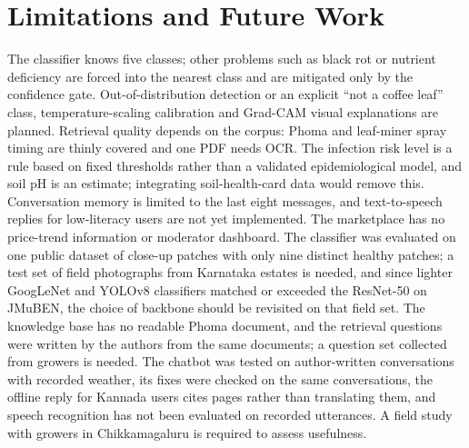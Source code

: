 \section{Limitations and Future Work}
The classifier knows five classes; other problems such as black rot or nutrient deficiency are forced into the nearest
class and are mitigated only by the confidence gate. Out-of-distribution detection or an explicit ``not a coffee leaf''
class, temperature-scaling calibration and Grad-CAM visual explanations are planned. Retrieval quality depends on the
corpus: Phoma and leaf-miner spray timing are thinly covered and one PDF needs OCR. The infection risk level is a rule
based on fixed thresholds rather than a validated epidemiological model, and soil pH is an estimate; integrating
soil-health-card data would remove this. Conversation memory is limited to the last eight messages, and text-to-speech replies for low-literacy users are not yet implemented. The
marketplace has no price-trend information or moderator dashboard. The classifier was evaluated on one public
dataset of close-up patches with only nine distinct healthy patches; a test set of field photographs from Karnataka
estates is needed, and since lighter GoogLeNet and YOLOv8 classifiers matched or exceeded the ResNet-50 on JMuBEN, the
choice of backbone should be revisited on that field set. The knowledge base has no readable Phoma document, and the retrieval questions were written by the authors from the
same documents; a question set collected from growers is needed. The chatbot was tested on author-written
conversations with recorded weather, its fixes were checked on the same conversations, the offline reply for Kannada
users cites pages rather than translating them, and speech recognition has not been evaluated on recorded utterances. A
field study with growers in Chikkamagaluru is required to assess usefulness.

